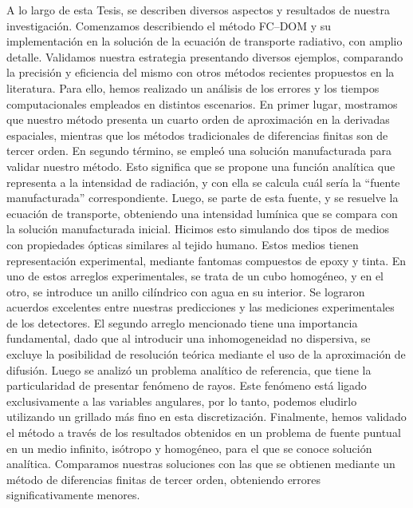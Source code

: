 A lo largo de esta Tesis, se describen diversos aspectos y resultados 
de nuestra investigación. 
Comenzamos describiendo el método FC--DOM y su implementación en la 
solución de la ecuación de transporte radiativo, con amplio detalle.
Validamos nuestra estrategia presentando diversos ejemplos, 
comparando la precisión y eficiencia del mismo con otros métodos 
recientes propuestos en la literatura.
Para ello, hemos realizado un análisis de los errores y los 
tiempos computacionales empleados en distintos escenarios.
En primer lugar, mostramos que nuestro método presenta un cuarto 
orden de aproximación en la derivadas espaciales, mientras que 
los métodos tradicionales de diferencias finitas son de tercer orden.
En segundo término, se empleó una solución manufacturada para 
validar nuestro método.
Esto significa que  
se propone una función analítica que representa a la intensidad 
de radiación, y con ella se calcula cuál sería la ``fuente manufacturada'' correspondiente.
Luego, se parte de esta fuente, y se resuelve la ecuación de transporte, 
obteniendo una intensidad lumínica que se compara con la solución 
manufacturada inicial. 
Hicimos esto simulando dos tipos de medios con propiedades ópticas similares 
al tejido humano. Estos medios tienen representación experimental, 
mediante fantomas compuestos de epoxy y tinta. 
En uno de estos arreglos experimentales, se trata de un cubo homogéneo, 
y en el otro, se introduce un anillo cilíndrico con agua en su interior.
Se lograron acuerdos excelentes entre nuestras predicciones y las 
mediciones experimentales de los detectores. El segundo arreglo mencionado 
tiene una importancia fundamental, dado que al introducir una inhomogeneidad 
no dispersiva, se excluye la posibilidad de resolución teórica mediante 
el uso de la aproximación de difusión.
Luego se analizó un problema analítico de referencia, que tiene la 
particularidad de presentar fenómeno de rayos. Este fenómeno está ligado 
exclusivamente a las variables angulares, por lo tanto, podemos eludirlo 
utilizando un grillado más fino en esta discretización. 
Finalmente, hemos validado el método a través de los resultados 
obtenidos en un problema de fuente puntual en un medio infinito, 
isótropo y homogéneo, 
para el que se conoce solución analítica.
Comparamos nuestras soluciones con las que se obtienen mediante un 
método de diferencias finitas de tercer orden, obteniendo errores 
significativamente menores.

